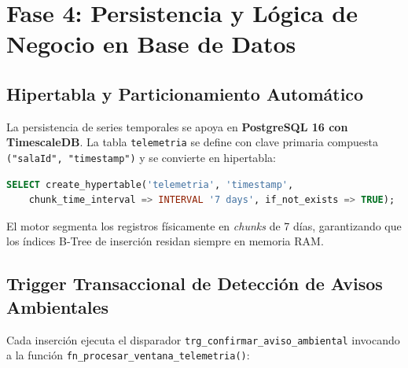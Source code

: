 \documentclass[11pt,a4paper]{article}
\begin{document}
\clearpage

\section{Fase 4: Persistencia y Lógica de Negocio en Base de Datos}

\subsection{Hipertabla y Particionamiento Automático}
La persistencia de series temporales se apoya en \textbf{PostgreSQL 16 con TimescaleDB}. La tabla \texttt{telemetria} se define con clave primaria compuesta \texttt{("salaId", "timestamp")} y se convierte en hipertabla:
\begin{lstlisting}[language=SQL]
SELECT create_hypertable('telemetria', 'timestamp', 
    chunk_time_interval => INTERVAL '7 days', if_not_exists => TRUE);
\end{lstlisting}
El motor segmenta los registros físicamente en \textit{chunks} de 7 días, garantizando que los índices B-Tree de inserción residan siempre en memoria RAM.

\subsection{Trigger Transaccional de Detección de Avisos Ambientales}
Cada inserción ejecuta el disparador \texttt{trg\_confirmar\_aviso\_ambiental} invocando a la función \texttt{fn\_procesar\_ventana\_telemetria()}:
\end{document}
